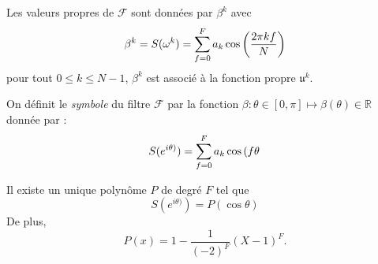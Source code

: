 \begin{theoreme}
Les valeurs propres de $\mathcal{F}$ sont données par $\beta^k$ avec 
\begin{equation}
\beta^k = S(\omega^k) = \displaystyle\sum\limits_{f=0}^F a_k \cos \left( \dfrac{2 \pi k f}{N} \right)
\end{equation}
pour tout $0 \leq k \leq N-1$, $\beta^k$ est associé à la fonction propre $\mathfrak{u}^k$.
\end{theoreme}

On définit le \textit{symbole} du filtre $\mathcal{F}$ par la fonction $\beta : \theta \in [0, \pi] \mapsto \beta(\theta) \in \mathbb{R}$ donnée par :
\begin{equation}
S(e^{i\theta)}) = \displaystyle\sum\limits_{f=0}^F a_k \cos \left( f \theta \right.
\end{equation}

\begin{proposition}
Il existe un unique polynôme $P$ de degré $F$ tel que 
\begin{equation}
S(e^{i\theta)}) = P(\cos \theta )
\end{equation}
De plus,
\begin{equation}
P(x) = 1 -\dfrac{1}{(-2)^F} (X - 1)^F.
\end{equation}
\end{proposition}

